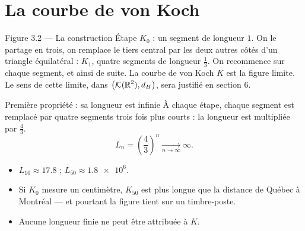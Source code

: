 \section{La courbe de von Koch}

\begin{frame}{Figure 3.2 --- La construction}
  \small Étape $K_0$ : un segment de longueur $1$. On le partage en trois,
  on remplace le tiers central par les deux autres côtés d'un triangle
  équilatéral : $K_1$, quatre segments de longueur $\tfrac13$. On
  recommence sur chaque segment, et ainsi de suite.
  \small La courbe de von Koch $K$ est la figure limite. Le sens de cette
  limite, dans $\big(\mathcal{K}(\operatorname{\mathbb{R}}^2),d_H\big)$, sera justifié en section 6.
\end{frame}

\begin{frame}{Première propriété : sa longueur est infinie}
  \small À chaque étape, chaque segment est remplacé par quatre segments
  trois fois plus courts : la longueur est multipliée par $\tfrac43$.
  \[
    L_n = \left(\frac43\right)^{\!n} \xrightarrow[n\to\infty]{} \infty .
  \]
  \begin{itemize}
    \item $L_{10}\approx\num{17.8}$ ; $L_{50}\approx\num{1.8e6}$.
    \item Si $K_0$ mesure un centimètre, $K_{50}$ est plus longue que la
      distance de Québec à Montréal --- et pourtant la figure tient sur
      un timbre-poste.
    \item Aucune longueur finie ne peut être attribuée à $K$.
  \end{itemize}
\end{frame}

